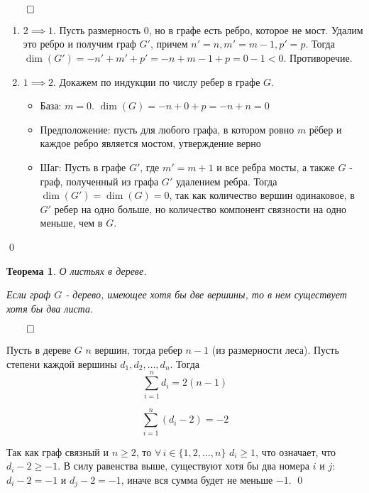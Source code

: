 \documentclass[a4paper,12pt,leqno]{article}
\theoremstyle{plain} %
\newtheorem{theorem}{Теорема}
\theoremstyle{definition} %
\renewenvironment{proof}{$\qed$}{{\qed}} %
\begin{document}
\begin{proof}
    
    \begin{enumerate}
        \item $2 \implies 1$.
        Пусть размерность 0, но в графе есть ребро, которое не мост. Удалим это ребро и получим граф $G'$, причем $n' = n, m' = m - 1, p' = p$. Тогда $\dim(G') = -n' + m' + p' = -n + m - 1 + p = 0 - 1 < 0$. Противоречие.
        
        \item $1 \implies 2$.
        Докажем по индукции по числу ребер в графе $G$.
        
        \begin{itemize}
            \item База: $m = 0$. $\dim(G) = -n + 0 + p = -n + n = 0$
            
            \item Предположение: пусть для любого графа, в котором ровно $m$ рёбер и каждое ребро является мостом, утверждение верно
            
            \item Шаг: Пусть в графе $G'$, где $m' = m + 1$ и все ребра мосты, а также $G$ - граф, полученный из графа $G'$ удалением ребра. Тогда $\dim(G') = \dim(G) = 0$, так как количество вершин одинаковое, в $G'$ ребер на одно больше, но количество компонент связности на одно меньше, чем в $G$.
        \end{itemize}
        
    \end{enumerate}
    
\end{proof}

\begin{theorem}\textit{О листьях в дереве.}

Если граф $G$ - дерево, имеющее хотя бы две вершины, то в нем существует хотя бы два листа.

\end{theorem}

\begin{proof}

Пусть в дереве $G$ $n$ вершин, тогда ребер $n - 1$ (из размерности леса). Пусть степени каждой вершины $d_1, d_2, \dots, d_n$. Тогда
\[\sum\limits_{i = 1}^n d_i = 2(n - 1)\]

\[\sum\limits_{i = 1}^n (d_i - 2) = -2\]

Так как граф связный и $n \geq 2$, то $\forall \, i \in \{1, 2, \dots, n\}$ $d_i \geq 1$, что означает, что $d_i - 2 \geq -1$. В силу равенства выше, существуют хотя бы два номера $i$ и $j$: $d_i - 2 = -1$ и $d_j - 2 = -1$, иначе вся сумма будет не меньше $-1$.
\end{proof}
\end{document}
